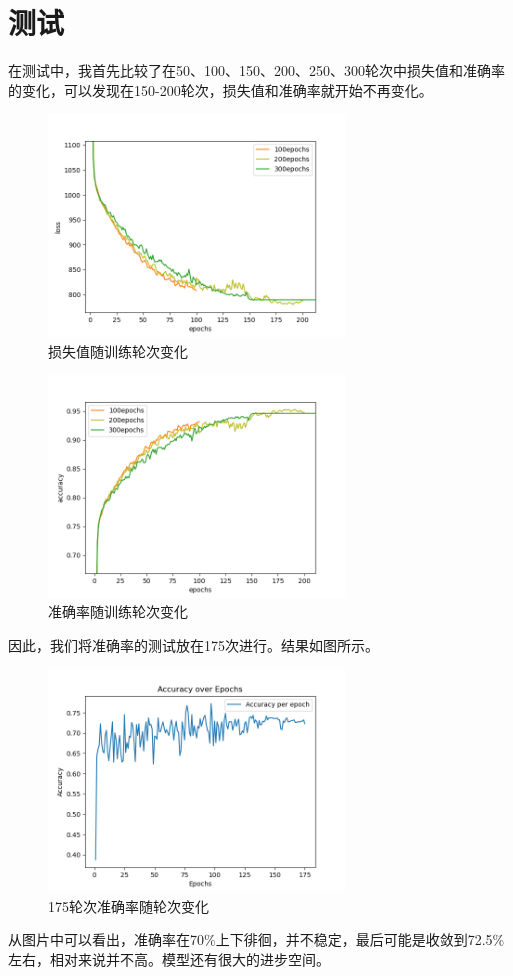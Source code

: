 \section{测试}
在测试中，我首先比较了在50、100、150、200、250、300轮次中损失值和准确率的变化，可以发现在150-200轮次，损失值和准确率就开始不再变化。
\begin{figure}[H]
	\centering
	\includegraphics[width=0.7\textwidth]{loss3.png}
	\caption{损失值随训练轮次变化}
	\label{fig:example}
\end{figure}
\begin{figure}[H]
	\centering
	\includegraphics[width=0.7\textwidth]{acc3.png}
	\caption{准确率随训练轮次变化}
	\label{fig:example}
\end{figure}

\newpage
因此，我们将准确率的测试放在175次进行。结果如图所示。
\begin{figure}[H]
	\centering
	\includegraphics[width=0.7\textwidth]{accperepoch.png}
	\caption{175轮次准确率随轮次变化}
	\label{fig:example}
\end{figure}
从图片中可以看出，准确率在70\%上下徘徊，并不稳定，最后可能是收敛到72.5\%左右，相对来说并不高。模型还有很大的进步空间。
